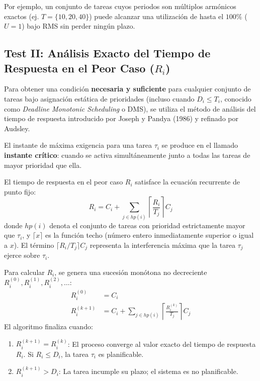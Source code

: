 Por ejemplo, un conjunto de tareas cuyos periodos son múltiplos armónicos exactos (ej. $T = \{10, 20, 40\}$) puede alcanzar una utilización de hasta el $100\%$ ($U = 1$) bajo RMS sin perder ningún plazo.

\subsection{Test II: Análisis Exacto del Tiempo de Respuesta en el Peor Caso \texorpdfstring{($R_i$)}{(Ri)}}
Para obtener una condición \textbf{necesaria y suficiente} para cualquier conjunto de tareas bajo asignación estática de prioridades (incluso cuando $D_i \le T_i$, conocido como \textit{Deadline Monotonic Scheduling} o DMS), se utiliza el método de análisis del tiempo de respuesta introducido por Joseph y Pandya (1986) y refinado por Audsley.

El instante de máxima exigencia para una tarea $\tau_i$ se produce en el llamado \textbf{instante crítico}: cuando se activa simultáneamente junto a todas las tareas de mayor prioridad que ella.

El tiempo de respuesta en el peor caso $R_i$ satisface la ecuación recurrente de punto fijo:
\begin{equation}
\label{eq:response_time}
R_i = C_i + \sum_{j \in hp(i)} \left\lceil \frac{R_i}{T_j} \right\rceil C_j
\end{equation}
donde $hp(i)$ denota el conjunto de tareas con prioridad estrictamente mayor que $\tau_i$, y $\lceil x \rceil$ es la función techo (número entero inmediatamente superior o igual a $x$). El término $\lceil R_i / T_j \rceil C_j$ representa la interferencia máxima que la tarea $\tau_j$ ejerce sobre $\tau_i$.

\begin{algoritmo}
Para calcular $R_i$, se genera una sucesión monótona no decreciente $R_i^{(0)}, R_i^{(1)}, R_i^{(2)}, \dots$:
\begin{align}
R_i^{(0)} &= C_i \\
R_i^{(k+1)} &= C_i + \sum_{j \in hp(i)} \left\lceil \frac{R_i^{(k)}}{T_j} \right\rceil C_j
\end{align}
El algoritmo finaliza cuando:
\begin{enumerate}
    \item $R_i^{(k+1)} = R_i^{(k)}$: El proceso converge al valor exacto del tiempo de respuesta $R_i$. Si $R_i \le D_i$, la tarea $\tau_i$ es planificable.
    \item $R_i^{(k+1)} > D_i$: La tarea incumple su plazo; el sistema es no planificable.
\end{enumerate}
\end{algoritmo}

